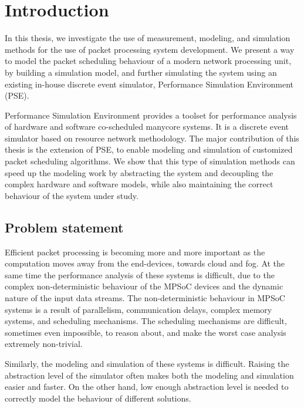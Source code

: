 \chapter{Introduction}
\label{chapter:intro}
In this thesis, we investigate the use of measurement, modeling, and simulation methods for the use of packet processing system development. We present a way to model the packet scheduling behaviour of a modern network processing unit, by building a simulation model, and further simulating the system using an existing in-house discrete event simulator, Performance Simulation Environment (PSE).

Performance Simulation Environment provides a toolset for performance analysis of hardware and software co-scheduled manycore systems. It is a discrete event simulator based on resource network methodology. The major contribution of this thesis is the extension of PSE, to enable modeling and simulation of customized packet scheduling algorithms. We show that this type of simulation methods can speed up the modeling work by abstracting the system and decoupling the complex hardware and software models, while also maintaining the correct behaviour of the system under study.

\section{Problem statement}

Efficient packet processing is becoming more and more important as the computation moves away from the end-devices, towards cloud and fog. At the same time the performance analysis of these systems is difficult, due to the complex non-deterministic behaviour of the MPSoC devices and the dynamic nature of the input data streams. The non-deterministic behaviour in MPSoC systems is a result of parallelism, communication delays, complex memory systems, and scheduling mechanisms. The scheduling mechanisms are difficult, sometimes even impossible, to reason about, and make the worst case analysis extremely non-trivial.

Similarly, the modeling and simulation of these systems is difficult. Raising the abstraction level of the simulator often makes both the modeling and simulation easier and faster. On the other hand, low enough abstraction level is needed to correctly model the behaviour of different solutions.

